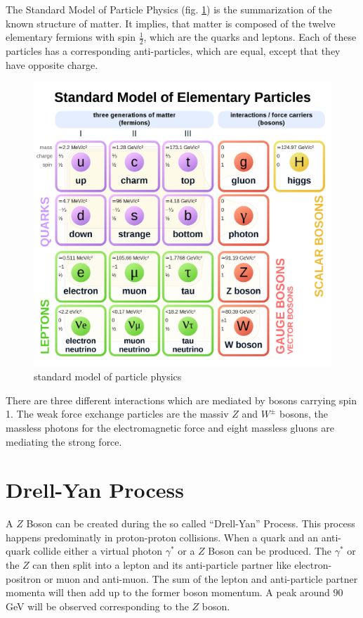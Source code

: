 \documentclass[12pt, a4paper, bibliography=totoc]{scrreprt}
\begin{document}
The Standard Model of Particle Physics (fig. \ref{fig:standard_model}) is the summarization of the known structure of matter.
It implies, that matter is composed of the twelve elementary fermions with spin $\frac{1}{2}$, which are the quarks and leptons. 
Each of these particles has a corresponding anti-particles, which are equal, except that they have opposite charge.

\begin{figure}[h]
	\centering
    \includegraphics[scale=0.1]{fig/standard_model.png}
	\caption{standard model of particle physics}
    \label{fig:standard_model}
\end{figure}

There are three different interactions which are mediated by bosons carrying spin 1.
The weak force exchange particles are the massiv $Z$ and $W^{\pm}$ bosons, the massless photons for the electromagnetic force and eight massless gluons are mediating the strong force. 
 
\section{Drell-Yan Process}
A $Z$ Boson can be created during the so called ``Drell-Yan'' Process. 
This process happens predominatly in proton-proton collisions.
When a quark and an anti-quark collide either a virtual photon $\gamma^\ast$ or a $Z$ Boson can be produced. 
The $\gamma^\ast$ or the $Z$ can then split into a lepton and its anti-particle partner like electron-positron or muon and anti-muon.
The sum of the lepton and anti-particle partner momenta will then add up to the former boson momentum. 
A peak around $90$ \si{GeV} will be observed corresponding to the $Z$ boson. 
\end{document}
